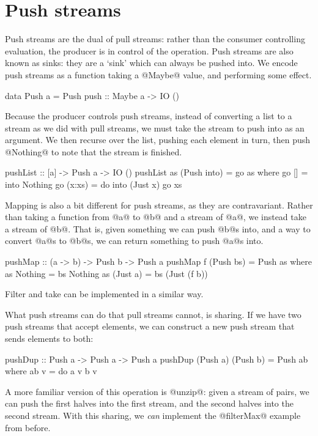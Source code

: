 \section{Push streams}

Push streams are the dual of pull streams: rather than the consumer controlling evaluation, the producer is in control of the operation.
Push streams are also known as sinks: they are a `sink' which can always be pushed into.
We encode push streams as a function taking a @Maybe@ value, and performing some effect.

\begin{code}
data Push a
  = Push
  { push :: Maybe a -> IO () }
\end{code}

Because the producer controls push streams, instead of converting a list to a stream as we did with pull streams, we must take the stream to push into as an argument.
We then recurse over the list, pushing each element in turn, then push @Nothing@ to note that the stream is finished.

\begin{code}
pushList :: [a] -> Push a -> IO ()
pushList as (Push into) = go as
 where
  go [] = into Nothing
  go (x:xs) = do
    into (Just x)
    go xs
\end{code}

Mapping is also a bit different for push streams, as they are contravariant. Rather than taking a function from @a@ to @b@ and a stream of @a@, we instead take a stream of @b@.
That is, given something we can push @b@s into, and a way to convert @a@s to @b@s, we can return something to push @a@s into.

\begin{code}
pushMap :: (a -> b) -> Push b -> Push a
pushMap f (Push bs) = Push as
 where
  as Nothing  = bs Nothing
  as (Just a) = bs (Just (f b))
\end{code}

Filter and take can be implemented in a similar way.

What push streams can do that pull streams cannot, is sharing.
If we have two push streams that accept elements, we can construct a new push stream that sends elements to both:

\begin{code}
pushDup :: Push a -> Push a -> Push a
pushDup (Push a) (Push b) = Push ab
 where
  ab v = do
   a v
   b v
\end{code}

A more familiar version of this operation is @unzip@: given a stream of pairs, we can push the first halves into the first stream, and the second halves into the second stream.
With this sharing, we \emph{can} implement the @filterMax@ example from before.

